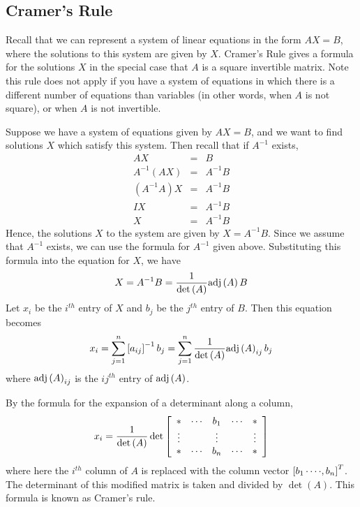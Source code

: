 \subsection{Cramer's Rule}

Recall that we can represent a system of linear equations in
the form $AX=B$, where the solutions to this system are given by $X$.
Cramer's Rule gives a formula for the solutions $X$ in the special
case that $A$ is a square invertible matrix. Note this rule does not
apply if you have a system of equations in which there is a different
number of equations than variables (in other words, when $A$ is not
square), or when $A$ is not invertible.

Suppose we have a system of equations given by $AX=B$, and we want to find solutions $X$ which satisfy 
this system.
Then recall that if $A^{-1}$ exists,
\begin{eqnarray*}
AX&=&B \\
A^{-1}\left(AX\right)&=&A^{-1}B \\
\left(A^{-1}A\right)X&=&A^{-1}B \\
IX&=&A^{-1}B\\
X &=& A^{-1}B
\end{eqnarray*}
Hence, the solutions $X$ to the system are given by $X=A^{-1}B$. 
Since we assume that $A^{-1}$ exists, we can use the
formula for $A^{-1}$ given above. Substituting this formula into the equation for $X$, we have 
\begin{equation*}
X=A^{-1}B=\frac{1}{\det \left( A\right) }\mbox{adj}\left( A\right)B
\end{equation*}
Let $x_i$ be the $i^{th}$ entry of $X$ and $b_j$ be the $j^{th}$ entry of $B$.
Then this equation becomes
\begin{equation*}
x_i = \sum_{j=1}^{n}\leftB a_{ij}\rightB^{-1}b_{j}=\sum_{j=1}^{n}\vspace{0.05in}\frac{1}
{\det \left( A\right) } \func{adj}\left( A\right) _{ij}b_{j}
\end{equation*}
where $\mbox{adj}\left(A\right)_{ij}$ is the $ij^{th}$ entry of $\mbox{adj}\left(A\right)$.

By the formula for the expansion of a determinant along a column,
\begin{equation*}
x_{i}=\vspace{0.05in}\frac{1}{\det \left( A\right) }\det \leftB
\begin{array}{ccccc}
\ast & \cdots & b_{1} & \cdots & \ast \\
\vdots &  & \vdots &  & \vdots \\
\ast & \cdots & b_{n} & \cdots & \ast
\end{array}
\rightB 
\end{equation*}
where here the $i^{th}$ column of $A$ is replaced with the column vector 
$\left[ b_{1}\cdots \cdot ,b_{n}\right] ^{T}$. The determinant of this
modified matrix is taken and divided by $\det \left( A\right) $. This
formula is known as Cramer's rule.

